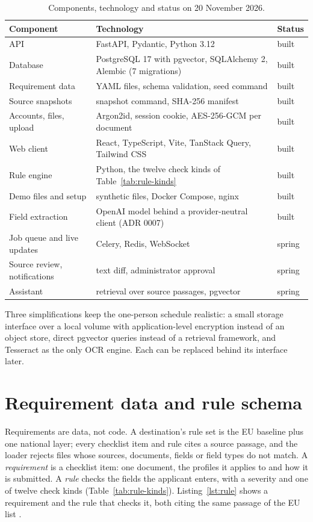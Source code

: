 \begin{table}[ht]
  \centering
  \small
  \caption{Components, technology and status on 20 November 2026.}
  \label{tab:components}
  \begin{tabularx}{\textwidth}{@{}lXl@{}}
    \toprule
    Component & Technology & Status \\
    \midrule
    API & FastAPI, Pydantic, Python 3.12 & built \\
    Database & PostgreSQL 17 with pgvector, SQLAlchemy 2, Alembic (7 migrations) & built \\
    Requirement data & YAML files, schema validation, seed command & built \\
    Source snapshots & snapshot command, SHA-256 manifest & built \\
    Accounts, files, upload & Argon2id, session cookie, AES-256-GCM per document & built \\
    Web client & React, TypeScript, Vite, TanStack Query, Tailwind CSS & built \\
    Rule engine & Python, the twelve check kinds of Table~\ref{tab:rule-kinds} & built \\
    Demo files and setup & synthetic files, Docker Compose, nginx & built \\
    Field extraction & OpenAI model behind a provider-neutral client (ADR 0007) & built \\
    Job queue and live updates & Celery, Redis, WebSocket & spring \\
    Source review, notifications & text diff, administrator approval & spring \\
    Assistant & retrieval over source passages, pgvector & spring \\
    \bottomrule
  \end{tabularx}
\end{table}

Three simplifications keep the one-person schedule realistic: a small storage interface over a
local volume with application-level encryption instead of an object store, direct pgvector
queries instead of a retrieval framework, and Tesseract as the only OCR engine. Each can be
replaced behind its interface later.

\section{Requirement data and rule schema}
Requirements are data, not code. A destination's rule set is the EU baseline plus one national
layer; every checklist item and rule cites a source passage, and the loader rejects files whose
sources, documents, fields or field types do not match. A \emph{requirement} is a checklist item:
one document, the profiles it applies to and how it is submitted. A \emph{rule} checks the fields
the applicant enters, with a severity and one of twelve check kinds
(Table~\ref{tab:rule-kinds}). Listing~\ref{lst:rule} shows a requirement and the rule that checks
it, both citing the same passage of the EU list \autocite{eu2021harmonised}.

